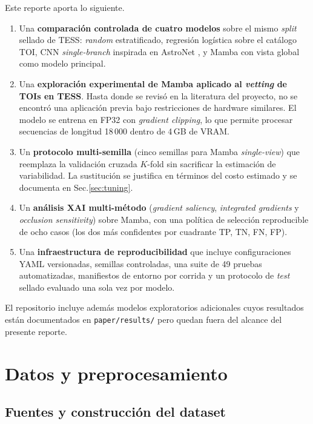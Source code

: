 \documentclass[11pt,a4paper]{article}
\begin{document}
Este reporte aporta lo siguiente.

\begin{enumerate}
  \item Una \textbf{comparación controlada de cuatro modelos} sobre el mismo
    \textit{split} sellado de TESS: \textit{random} estratificado, regresión
    logística sobre el catálogo TOI, CNN \textit{single-branch} inspirada
    en AstroNet \cite{shallue2018}, y Mamba con vista global como modelo
    principal.
  \item Una \textbf{exploración experimental de Mamba aplicado al
    \textit{vetting} de TOIs en TESS}. Hasta donde se revisó en la
    literatura del proyecto, no se encontró una aplicación previa bajo
    restricciones de hardware similares. El modelo se entrena en FP32
    con \textit{gradient clipping}, lo que permite procesar
    secuencias de longitud 18\,000 dentro de 4\,GB de VRAM.
  \item Un \textbf{protocolo multi-semilla} (cinco semillas para Mamba
    \textit{single-view}) que reemplaza la validación cruzada $K$-fold
    sin sacrificar la estimación de variabilidad. La sustitución se
    justifica en términos del costo estimado y se documenta en
    Sec.\ref{sec:tuning}.
  \item Un \textbf{análisis XAI multi-método} (\textit{gradient saliency},
    \textit{integrated gradients} y \textit{occlusion sensitivity}) sobre
    Mamba, con una política de selección reproducible de ocho casos
    (los dos más confidentes por cuadrante TP, TN, FN, FP).
  \item Una \textbf{infraestructura de reproducibilidad} que incluye
    configuraciones YAML versionadas, semillas controladas, una suite de
    49 pruebas automatizadas, manifiestos de entorno por corrida y un
    protocolo de \textit{test} sellado evaluado una sola vez por modelo.
\end{enumerate}

El repositorio incluye además modelos exploratorios adicionales cuyos
resultados están documentados en \texttt{paper/results/} pero quedan
fuera del alcance del presente reporte.



\section{Datos y preprocesamiento}
\label{sec:data}

\subsection{Fuentes y construcción del dataset}
\label{subsec:fuentes}
\end{document}
